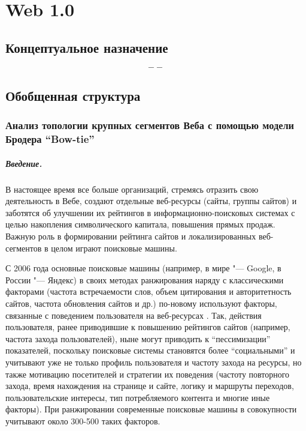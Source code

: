\chapter{Web 1.0}\label{ch:ch1}

\section{Концептуальное назначение}\label{sec:ch1/sec1}

\[
--
\]

\section{Обобщенная структура}\label{sec:ch1/sec2}

\subsection{Анализ топологии крупных сегментов Веба с помощью модели Бродера “Bow-tie”}\label{subsec:ch1/sec2/sub1}

\paragraph{Введение.} В настоящее время все больше организаций, стремясь отразить свою деятельность в Вебе, создают отдельные веб-ресурсы (сайты, группы сайтов) и заботятся об улучшении их рейтингов в информационно-поисковых системах с целью накопления символического капитала, повышения прямых продаж. Важную роль в формировании рейтинга сайтов и локализированных веб-сегментов в целом играют поисковые машины.

С 2006 года основные поисковые машины (например, в мире "--- Google, в России "--- Яндекс) в своих методах ранжирования наряду с классическими факторами \cite{Kleinberg, BrinPage, Chakrabarti} (частота встречаемости слов, объем цитирования и авторитетность сайтов, частота обновления сайтов и др.) по-новому используют факторы, связанные с поведением пользователя на веб-ресурсах \cite{GuhaKunduBhadra,AntoniouPlegasTsakalidis,FeuerSavevAslam}. Так, действия пользователя, ранее приводившие к повышению рейтингов сайтов (например, частота захода пользователей), ныне могут приводить к “пессимизации” показателей, поскольку поисковые системы становятся более “социальными” и учитывают уже не только профиль пользователя и частоту захода на ресурсы, но также мотивацию посетителей и стратегии их поведения (частоту повторного захода, время нахождения на странице и сайте, логику и маршруты переходов, пользовательские интересы, тип потребляемого контента и многие иные факторы). При ранжировании современные поисковые машины в совокупности учитывают около 300-500 таких факторов.

